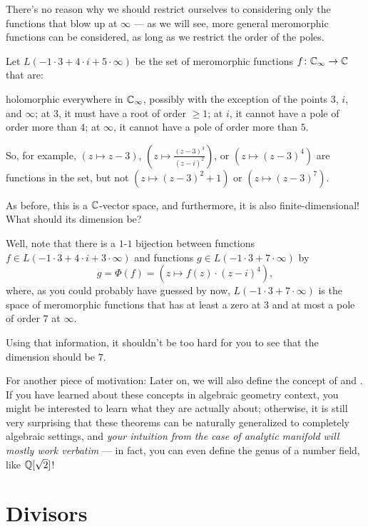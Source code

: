 \begin{example}
	There's no reason why we should restrict ourselves to considering only the functions that blow
	up at $\infty$ --- as we will see, more general meromorphic functions can be considered, as long
	as we restrict the order of the poles.

	Let $L(-1 \cdot 3 + 4 \cdot i + 5 \cdot \infty)$ be the set of meromorphic functions $f \colon
	\mathbb C_\infty \to \mathbb C$ that are:
	\begin{itemize}
		\ii holomorphic everywhere in $\mathbb C_\infty$,
		possibly with the exception of the points $3$, $i$, and $\infty$;
		\ii at $3$, it must have a root of order $\geq 1$;
		\ii at $i$, it cannot have a pole of order more than $4$;
		\ii at $\infty$, it cannot have a pole of order more than $5$.
	\end{itemize}
	So, for example, $(z \mapsto z-3)$, $(z \mapsto \frac{(z-3)^3}{(z-i)^2})$, or $(z \mapsto
	(z-3)^4)$ are functions in the set, but not $(z \mapsto (z-3)^2+1)$ or $(z \mapsto (z-3)^7)$.

	As before, this is a $\mathbb C$-vector space, and furthermore, it is also finite-dimensional!
	What should its dimension be?

	Well, note that there is a $1$-$1$ bijection between functions $f \in L(-1 \cdot 3 + 4 \cdot i +
	3 \cdot \infty)$ and functions $g \in L(-1 \cdot 3 + 7 \cdot \infty)$ by
	\[ g = \Phi(f) = (z \mapsto f(z) \cdot (z-i)^4), \]
	where, as you could probably have guessed by now, $L(-1 \cdot 3 + 7 \cdot \infty)$ is the space
	of meromorphic functions that has at least a zero at $3$ and at most a pole of order $7$ at
	$\infty$.

	Using that information, it shouldn't be too hard for you to see that the dimension should be
	$7$.
\end{example}

For another piece of motivation:
Later on, we will also define the concept of  and .
If you have learned about these concepts in algebraic geometry context, you might be interested to
learn what they are actually about;
otherwise,
it is still very surprising that these theorems can be naturally generalized to completely algebraic
settings, and \emph{your intuition from
the case of analytic manifold will mostly work verbatim} --- in fact, you can even define the genus
of a number field, like $\mathbb Q[\sqrt 2]$!

\section{Divisors}


